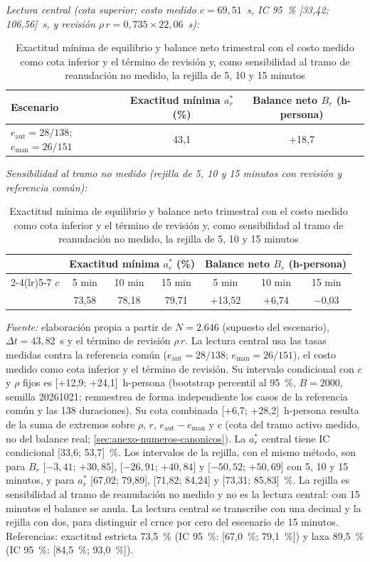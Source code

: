 \begin{table}[htbp]
\centering
\caption{Exactitud mínima de equilibrio y balance neto trimestral con el costo medido como cota inferior y el término de revisión y, como sensibilidad al tramo de reanudación no medido, la rejilla de 5, 10 y 15 minutos}
\label{tab:balance-neto}
\footnotesize
\textit{Lectura central (cota superior; costo medido \(c = 69{,}51\)~s, IC 95~\% [33,42; 106,56]~s, y revisión \(\rho\,r = 0{,}735 \times 22{,}06\)~s):}\par\smallskip
\begin{tabular}{@{}l cc@{}}
\toprule
\textbf{Escenario} & \textbf{Exactitud mínima \(a^{*}_r\) (\%)} & \textbf{Balance neto \(B_r\) (h-persona)} \\
\midrule
\(e_{\mathrm{aut}} = 28/138\); \(e_{\mathrm{man}} = 26/151\) & 43,1 & +18,7 \\
\bottomrule
\end{tabular}
\par\medskip
\textit{Sensibilidad al tramo no medido (rejilla de 5, 10 y 15 minutos con revisión y referencia común):}\par\smallskip
\begin{tabular}{@{}l ccc ccc@{}}
\toprule
 & \multicolumn{3}{c}{\textbf{Exactitud mínima \(a^{*}_r\) (\%)}} & \multicolumn{3}{c}{\textbf{Balance neto \(B_r\) (h-persona)}} \\
\cmidrule(lr){2-4}\cmidrule(lr){5-7}
\textbf{\(c\)} & 5 min & 10 min & 15 min & 5 min & 10 min & 15 min \\
\midrule
 & 73,58 & 78,18 & 79,71 & +13,52 & +6,74 & \(-\)0,03 \\
\bottomrule
\end{tabular}
\par\smallskip
{\footnotesize\textit{Fuente:} elaboración propia a partir de \(N = 2.646\) (supuesto del escenario), \(\Delta t = 43{,}82\)~s y el término de revisión \(\rho\,r\). La lectura central usa las tasas medidas contra la referencia común (\(e_{\mathrm{aut}} = 28/138\); \(e_{\mathrm{man}} = 26/151\)), el costo medido como cota inferior y el término de revisión. Su intervalo condicional con \(c\) y \(\rho\) fijos es [+12,9; +24,1]~h-persona (bootstrap percentil al 95~\%, \(B = 2000\), semilla 20261021; remuestrea de forma independiente los casos de la referencia común y las 138 duraciones). Su cota combinada [+6,7; +28,2]~h-persona resulta de la suma de extremos sobre \(\rho\), \(r\), \(e_{\mathrm{aut}} - e_{\mathrm{man}}\) y \(c\) (cota del tramo activo medido, no del balance real; \autoref{sec:anexo-numeros-canonicos}). La \(a^{*}_r\) central tiene IC condicional [33,6; 53,7]~\%. Los intervalos de la rejilla, con el mismo método, son para \(B_r\) [\(-3{,}41\); \(+30{,}85\)], [\(-26{,}91\); \(+40{,}84\)] y [\(-50{,}52\); \(+50{,}69\)] con 5, 10 y 15 minutos, y para \(a^{*}_r\) [67,02; 79,89], [71,82; 84,24] y [73,31; 85,83]~\%. La rejilla es sensibilidad al tramo de reanudación no medido y no es la lectura central: con 15 minutos el balance se anula. La lectura central se transcribe con una decimal y la rejilla con dos, para distinguir el cruce por cero del escenario de 15 minutos. Referencias: exactitud estricta 73,5~\% (IC 95~\%: [67,0~\%; 79,1~\%]) y laxa 89,5~\% (IC 95~\%: [84,5~\%; 93,0~\%]).\par}

\end{table}
